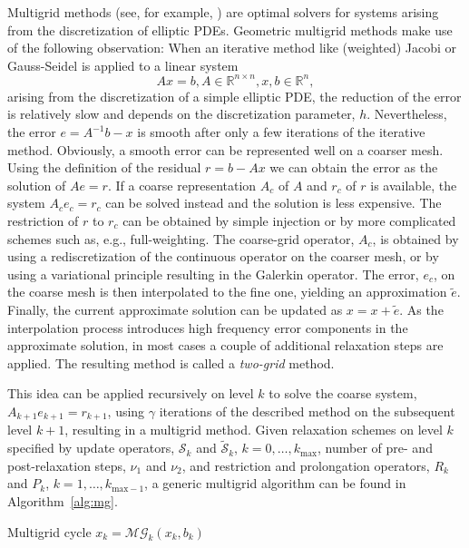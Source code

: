 Multigrid methods (see, for
example, \cite{WLBriggs_VEHenson_SFMcCormick_2000a, UTrottenberg_etal_2001a}) are optimal solvers for systems arising from the
discretization of elliptic PDEs. Geometric multigrid methods make use
of the following observation: When an iterative method like (weighted)
Jacobi or Gauss-Seidel is applied to a linear system
\[
  A x = b, A \in \mathbb{R}^{n \times n}, x, b \in \mathbb{R}^n,
\]
arising from the discretization of a simple elliptic PDE, the
reduction of the error is relatively slow and depends on the
discretization parameter, $h$. Nevertheless, the error $e = A^{-1} b -
x$ is smooth after only a few iterations of the iterative
method. Obviously, a smooth error can be represented well on a coarser
mesh. Using the definition of the residual $r = b - A x$ we can obtain
the error as the solution of $A e = r$. If a coarse representation
$A_c$ of $A$ and $r_c$ of $r$ is available, the system $A_c e_c = r_c$
can be solved instead and the solution is less expensive. The
restriction of $r$ to $r_c$ can be obtained by simple injection or by
more complicated schemes such as, e.g., full-weighting. The coarse-grid
operator, $A_c$, is obtained by using a rediscretization of the
continuous operator on the coarser mesh, or by using a variational
principle resulting in the Galerkin operator. The error, $e_c$, on the
coarse mesh is then interpolated to the fine one, yielding an
approximation $\tilde{e}$. Finally, the current approximate solution
can be updated as $x = x + \tilde{e}$. As the interpolation process
introduces high frequency error components in the approximate
solution, in most cases a couple of additional relaxation steps are
applied. The resulting method is called a
\emph{two-grid} method.

This idea can be applied recursively on level
$k$ to solve the coarse system, $A_{k+1} e_{k+1} = r_{k+1}$,
using $\gamma$ iterations of the described method on the subsequent
level $k+1$, resulting in a multigrid method. Given relaxation
schemes on level $k$ specified by update operators,
$\mathcal{S}_k$ and $\tilde{\mathcal{S}}_k$,
$k = 0,\dots,k_\text{max}$, number of pre- and post-relaxation steps, $\nu_1$ and $\nu_2$, and restriction and prolongation operators,
$R_k$ and $P_k$, $k = 1,\dots,k_{\text{max}-1}$, a generic
multigrid algorithm can be found in Algorithm~\ref{alg:mg}.

\begin{algorithm}
  \caption{Multigrid cycle $x_k = \mathcal{MG}_k(x_k,b_k)$}
  \label{alg:mg}
  \begin{algorithmic}
  \ELSE
  \ENDIF
  \end{algorithmic}
\end{algorithm}


